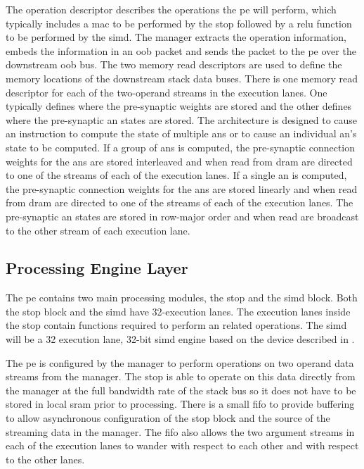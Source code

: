 The operation descriptor describes the operations the \ac{pe} will perform, which typically includes a \ac{mac} to be performed by the \ac{stop} followed by a \ac{relu} \cite{maas2013rectifier} function to be performed by the \ac{simd}.
The manager extracts the operation information, embeds the information in an \ac{oob} packet and sends the packet to the \ac{pe} over the downstream \ac{oob} bus.
The two memory read descriptors are used to define the memory locations of the downstream stack data buses.
There is one memory read descriptor for each of the two-operand streams in the execution lanes.  One typically defines where the pre-synaptic weights are stored and the other defines where the pre-synaptic \ac{an} states are stored.
The architecture is designed to cause an instruction to compute the state of multiple \acp{an} or to cause an individual \ac{an}'s state to be computed.
If a group of \acp{an} is computed, the pre-synaptic connection weights for the \acp{an} are stored interleaved and when read from \ac{dram} are directed to one of the streams of each of the execution lanes.
If a single \ac{an} is computed, the pre-synaptic connection weights for the \acp{an} are stored linearly and when read from \ac{dram} are directed to one of the streams of each of the execution lanes.
The pre-synaptic \ac{an} states are stored in row-major order and when read are broadcast to the other stream of each execution lane.



\subsection{Processing Engine Layer}
\label{sec:Processing Engine Layer}
The \ac{pe} contains two main processing modules, the \ac{stop} and the \ac{simd} block.
Both the \ac{stop} block and the \ac{simd} have 32-execution lanes. The execution lanes inside the \ac{stop} contain functions required to perform \ac{an} related operations.
The \ac{simd} will be a 32 execution lane, 32-bit \ac{simd} engine based on the device described in \cite{schabel2016processor}.

The \ac{pe} is configured by the manager to perform operations on two operand data streams from the manager. 
The \ac{stop} is able to operate on this data directly from the manager at the full bandwidth rate of the stack bus so it does not have to be stored in local \ac{sram} prior to processing. 
There is a small \ac{fifo} to provide buffering to allow asynchronous configuration of the \ac{stop} block and the source of the streaming data in the manager. 
The \ac{fifo} also allows the two argument streams in each of the execution lanes to wander with respect to each other and with respect to the other lanes.

